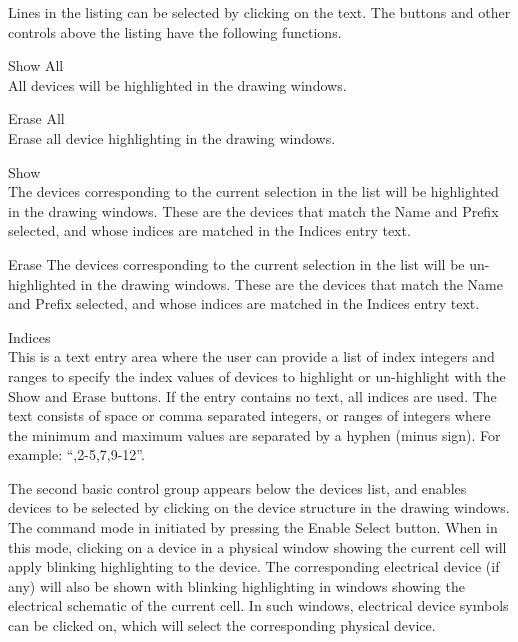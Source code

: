 Lines in the listing can be selected by clicking on the text.  The
buttons and other controls above the listing have the following
functions.

\begin{description}
\item{\cb Show All}\\
All devices will be highlighted in the drawing windows.

\item{\cb Erase All}\\
Erase all device highlighting in the drawing windows.

\item{Show}\\
The devices corresponding to the current selection in the list will be
highlighted in the drawing windows.  These are the devices that match
the {\cb Name} and {\cb Prefix} selected, and whose indices are
matched in the {\cb Indices} entry text.

\item{\cb Erase}
The devices corresponding to the current selection in the list will be
un-highlighted in the drawing windows.  These are the devices that
match the {\cb Name} and {\cb Prefix} selected, and whose indices are
matched in the {\cb Indices} entry text.

\item{\cb Indices}\\
This is a text entry area where the user can provide a list of index
integers and ranges to specify the index values of devices to
highlight or un-highlight with the {\cb Show} and {\cb Erase} buttons. 
If the entry contains no text, all indices are used.  The text
consists of space or comma separated integers, or ranges of integers
where the minimum and maximum values are separated by a hyphen (minus
sign).  For example:  ``{,2-5,7,9-12}''.
\end{description}

The second basic control group appears below the devices list, and
enables devices to be selected by clicking on the device structure in
the drawing windows.  The command mode in initiated by pressing the
{\cb Enable Select} button.  When in this mode, clicking on a device
in a physical window showing the current cell will apply blinking
highlighting to the device.  The corresponding electrical device (if
any) will also be shown with blinking highlighting in windows showing
the electrical schematic of the current cell.  In such windows,
electrical device symbols can be clicked on, which will select the
corresponding physical device.

